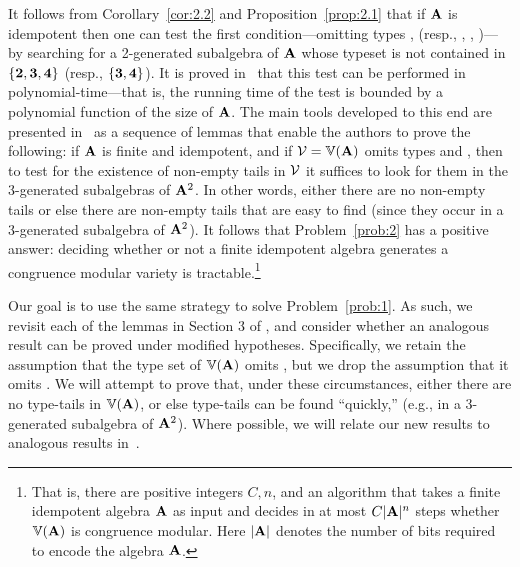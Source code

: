 It follows from Corollary~\ref{cor:2.2} and Proposition~\ref{prop:2.1}
that if $\mathbf{A}$ is idempotent then one can
test the first condition---omitting 
types \utyp, \styp (resp., \utyp, \atyp, \styp)---by searching
for a 2-generated subalgebra of $\mathbf{A}$ whose typeset is 
not contained in
$\{\textbf{2}, \textbf{3}, \textbf{4}\}$ (resp., $\{\textbf{3}, \textbf{4}\}$). It is proved 
in~\cite[Section~6]{Freese:2009} that this
test can be performed in polynomial-time---that is, the running 
time of the test is bounded by a polynomial function of the size of $\mathbf{A}$.
The main tools developed to this end are presented 
in~\cite[Section~3]{Freese:2009} as a sequence of
lemmas that enable the authors to prove the following: 
if $\mathbf{A}$ is finite and idempotent, and if
$\mathcal V = \operatorname{\mathbb{V}}(\mathbf{A})$ omits types \utyp and \styp, 
then to test for the existence of non-empty tails
in $\mathcal{V}$ it suffices to look for them 
in the 3-generated subalgebras of $\mathbf{A}^2$.
In other words, either there are no non-empty tails
or else there are non-empty tails that are easy to find
(since they occur in a 3-generated subalgebra of $\mathbf{A}^2$).
It follows that Problem~\ref{prob:2} has a positive answer:
deciding whether or not a finite idempotent algebra generates a congruence
modular variety is tractable.\footnote{That is, there are positive integers
  $C, n$, and an algorithm that takes
  a finite idempotent algebra $\mathbf{A}$ as input and decides
  in at most $C|\mathbf{A}|^n$ steps whether $\operatorname{\mathbb{V}}(\mathbf{A})$ is congruence modular.
  Here $|\mathbf{A}|$ denotes the number of bits required to encode the algebra $\mathbf{A}$.}

Our goal is to use the same strategy to solve Problem~\ref{prob:1}.
As such, we revisit each of the lemmas in Section 3 of \cite{Freese:2009},
and consider whether an analogous result can be proved under
modified hypotheses.
Specifically, we retain the assumption that the type set of $\operatorname{\mathbb{V}}(\mathbf{A})$ 
omits \utyp, but we drop the assumption that it omits \styp.
We will attempt to prove that, under these circumstances,
either there are no type-\atyp tails in $\operatorname{\mathbb{V}}(\mathbf{A})$, 
or else type-\atyp tails can be found ``quickly,'' 
(e.g., in a 3-generated subalgebra of $\mathbf{A}^2$).
Where possible, we will relate our new results to 
analogous results in~\cite{Freese:2009}.

